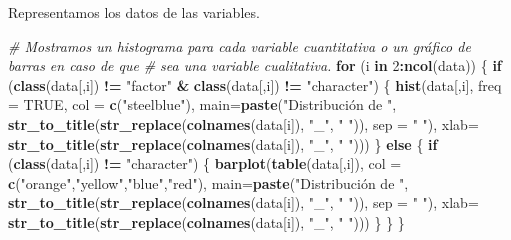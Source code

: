 \documentclass[]{article}
\newenvironment{Shaded}{\begin{snugshade}}{\end{snugshade}}
\newcommand{\KeywordTok}[1]{\textcolor[rgb]{0.13,0.29,0.53}{\textbf{#1}}}
\newcommand{\DataTypeTok}[1]{\textcolor[rgb]{0.13,0.29,0.53}{#1}}
\newcommand{\DecValTok}[1]{\textcolor[rgb]{0.00,0.00,0.81}{#1}}
\newcommand{\StringTok}[1]{\textcolor[rgb]{0.31,0.60,0.02}{#1}}
\newcommand{\CommentTok}[1]{\textcolor[rgb]{0.56,0.35,0.01}{\textit{#1}}}
\newcommand{\OtherTok}[1]{\textcolor[rgb]{0.56,0.35,0.01}{#1}}
\newcommand{\ControlFlowTok}[1]{\textcolor[rgb]{0.13,0.29,0.53}{\textbf{#1}}}
\newcommand{\OperatorTok}[1]{\textcolor[rgb]{0.81,0.36,0.00}{\textbf{#1}}}
\newcommand{\NormalTok}[1]{#1}
\begin{document}
Representamos los datos de las variables.

\begin{Shaded}
\begin{Highlighting}[]
\CommentTok{# Mostramos un histograma para cada variable cuantitativa o un gráfico de barras en caso de que}
\CommentTok{# sea una variable cualitativa.}
\ControlFlowTok{for}\NormalTok{ (i }\ControlFlowTok{in} \DecValTok{2}\OperatorTok{:}\KeywordTok{ncol}\NormalTok{(data)) \{}
  \ControlFlowTok{if}\NormalTok{ (}\KeywordTok{class}\NormalTok{(data[,i]) }\OperatorTok{!=}\StringTok{ "factor"} \OperatorTok{&}\StringTok{ }\KeywordTok{class}\NormalTok{(data[,i]) }\OperatorTok{!=}\StringTok{ "character"}\NormalTok{)  \{}
    \KeywordTok{hist}\NormalTok{(data[,i], }\DataTypeTok{freq =} \OtherTok{TRUE}\NormalTok{, }\DataTypeTok{col =} \KeywordTok{c}\NormalTok{(}\StringTok{"steelblue"}\NormalTok{), }
         \DataTypeTok{main=}\KeywordTok{paste}\NormalTok{(}\StringTok{"Distribución de "}\NormalTok{, }
                    \KeywordTok{str_to_title}\NormalTok{(}\KeywordTok{str_replace}\NormalTok{(}\KeywordTok{colnames}\NormalTok{(data[i]), }\StringTok{"_"}\NormalTok{, }\StringTok{" "}\NormalTok{)), }\DataTypeTok{sep =} \StringTok{" "}\NormalTok{),}
         \DataTypeTok{xlab=} \KeywordTok{str_to_title}\NormalTok{(}\KeywordTok{str_replace}\NormalTok{(}\KeywordTok{colnames}\NormalTok{(data[i]), }\StringTok{"_"}\NormalTok{, }\StringTok{" "}\NormalTok{)))}
\NormalTok{  \}}
  \ControlFlowTok{else}\NormalTok{ \{}
    \ControlFlowTok{if}\NormalTok{ (}\KeywordTok{class}\NormalTok{(data[,i]) }\OperatorTok{!=}\StringTok{ "character"}\NormalTok{) \{}
      \KeywordTok{barplot}\NormalTok{(}\KeywordTok{table}\NormalTok{(data[,i]),}
            \DataTypeTok{col =} \KeywordTok{c}\NormalTok{(}\StringTok{"orange"}\NormalTok{,}\StringTok{"yellow"}\NormalTok{,}\StringTok{"blue"}\NormalTok{,}\StringTok{"red"}\NormalTok{),}
            \DataTypeTok{main=}\KeywordTok{paste}\NormalTok{(}\StringTok{"Distribución de "}\NormalTok{, }
                    \KeywordTok{str_to_title}\NormalTok{(}\KeywordTok{str_replace}\NormalTok{(}\KeywordTok{colnames}\NormalTok{(data[i]), }\StringTok{"_"}\NormalTok{, }\StringTok{" "}\NormalTok{)), }\DataTypeTok{sep =} \StringTok{" "}\NormalTok{),}
            \DataTypeTok{xlab=} \KeywordTok{str_to_title}\NormalTok{(}\KeywordTok{str_replace}\NormalTok{(}\KeywordTok{colnames}\NormalTok{(data[i]), }\StringTok{"_"}\NormalTok{, }\StringTok{" "}\NormalTok{)))}
\NormalTok{    \}}
\NormalTok{  \}}
\NormalTok{\}}
\end{Highlighting}
\end{Shaded}
\end{document}
